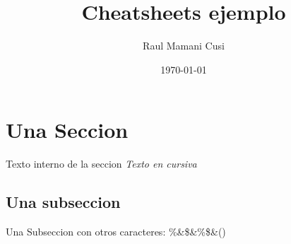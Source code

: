 \documentclass{article}%
\title{Cheatsheets ejemplo}%
\author{Raul Mamani Cusi}%
\date{\today}%
\begin{document}
%
\normalsize%
\maketitle%
\section{Una Seccion}%
\label{sec:UnaSeccion}%
Texto interno de la seccion%
\textit{Texto en cursiva}%
\subsection{Una subseccion}%
\label{subsec:Unasubseccion}%
Una Subseccion con otros caracteres: \%\&\$\&\%\$\&()

%
\end{document}
